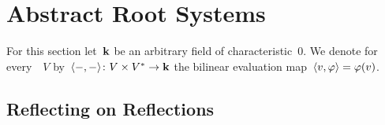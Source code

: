 \section{Abstract Root Systems}




\begin{convention}
  For this section let~$\kf$ be an arbitrary field of characteristic~$0$.
  We denote for every~{\vectorspace{$\kf$}}~$V$ by~$\langle-,-\rangle \colon V \times V^* \to \mathbf{k}$ the bilinear evaluation map~$\langle v, \varphi\rangle = \varphi(v)$.
\end{convention}





\subsection{Reflecting on Reflections}


